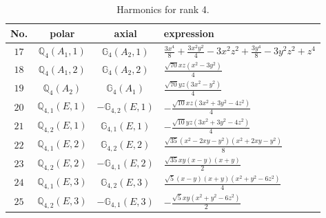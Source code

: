 \documentclass[fleqn,8pt,landscape]{jsarticle}
\begin{document}
\begin{table}[ht!]
\begin{center}
\caption{Harmonics for rank 4.}
\renewcommand{\arraystretch}{1.3}
\begin{tabular}{cccl} \hline \hline
No. & polar & axial & expression \\ \hline
$ 17 $ & $ \mathbb{Q}_{4}(A_{1},1) $ & $ \mathbb{G}_{4}(A_{2},1) $ & $ \frac{3 x^{4}}{8} + \frac{3 x^{2} y^{2}}{4} - 3 x^{2} z^{2} + \frac{3 y^{4}}{8} - 3 y^{2} z^{2} + z^{4} $ \\
$ 18 $ & $ \mathbb{Q}_{4}(A_{1},2) $ & $ \mathbb{G}_{4}(A_{2},2) $ & $ \frac{\sqrt{70} x z \left(x^{2} - 3 y^{2}\right)}{4} $ \\
$ 19 $ & $ \mathbb{Q}_{4}(A_{2}) $ & $ \mathbb{G}_{4}(A_{1}) $ & $ \frac{\sqrt{70} y z \left(3 x^{2} - y^{2}\right)}{4} $ \\
$ 20 $ & $ \mathbb{Q}_{4,1}(E,1) $ & $ -\mathbb{G}_{4,2}(E,1) $ & $ - \frac{\sqrt{10} x z \left(3 x^{2} + 3 y^{2} - 4 z^{2}\right)}{4} $ \\
$ 21 $ & $ \mathbb{Q}_{4,2}(E,1) $ & $ \mathbb{G}_{4,1}(E,1) $ & $ - \frac{\sqrt{10} y z \left(3 x^{2} + 3 y^{2} - 4 z^{2}\right)}{4} $ \\
$ 22 $ & $ \mathbb{Q}_{4,1}(E,2) $ & $ \mathbb{G}_{4,2}(E,2) $ & $ \frac{\sqrt{35} \left(x^{2} - 2 x y - y^{2}\right) \left(x^{2} + 2 x y - y^{2}\right)}{8} $ \\
$ 23 $ & $ \mathbb{Q}_{4,2}(E,2) $ & $ -\mathbb{G}_{4,1}(E,2) $ & $ \frac{\sqrt{35} x y \left(x - y\right) \left(x + y\right)}{2} $ \\
$ 24 $ & $ \mathbb{Q}_{4,1}(E,3) $ & $ \mathbb{G}_{4,2}(E,3) $ & $ \frac{\sqrt{5} \left(x - y\right) \left(x + y\right) \left(x^{2} + y^{2} - 6 z^{2}\right)}{4} $ \\
$ 25 $ & $ \mathbb{Q}_{4,2}(E,3) $ & $ -\mathbb{G}_{4,1}(E,3) $ & $ - \frac{\sqrt{5} x y \left(x^{2} + y^{2} - 6 z^{2}\right)}{2} $ \\
 \hline \hline
\end{tabular}
\end{center}
\end{table}
\end{document}
